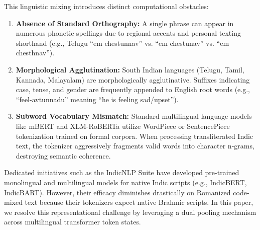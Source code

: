 \documentclass[10pt,journal,compsoc]{IEEEtran}
\begin{document}
This linguistic mixing introduces distinct computational obstacles:
\begin{enumerate}
    \item \textbf{Absence of Standard Orthography:} A single phrase can appear in numerous phonetic spellings due to regional accents and personal texting shorthand (e.g., Telugu ``em chestunnav'' vs. ``em chestunav'' vs. ``em chesthnav'').
    \item \textbf{Morphological Agglutination:} South Indian languages (Telugu, Tamil, Kannada, Malayalam) are morphologically agglutinative. Suffixes indicating case, tense, and gender are frequently appended to English root words (e.g., ``feel-avtunnadu'' meaning ``he is feeling sad/upset'').
    \item \textbf{Subword Vocabulary Mismatch:} Standard multilingual language models like mBERT \cite{devlin2019bert} and XLM-RoBERTa \cite{conneau2020unsupervised} utilize WordPiece or SentencePiece tokenization trained on formal corpora. When processing transliterated Indic text, the tokenizer aggressively fragments valid words into character n-grams, destroying semantic coherence.
\end{enumerate}

Dedicated initiatives such as the IndicNLP Suite \cite{kakwani2020indicnlpsuite} have developed pre-trained monolingual and multilingual models for native Indic scripts (e.g., IndicBERT, IndicBART). However, their efficacy diminishes drastically on Romanized code-mixed text because their tokenizers expect native Brahmic scripts. In this paper, we resolve this representational challenge by leveraging a dual pooling mechanism across multilingual transformer token states.
\end{document}
